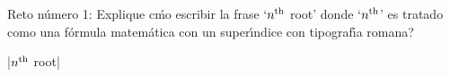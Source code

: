 

\bigskip

\enunciadoS Reto n\'umero 1: Explique c\'mo escribir la frase 
`$n^{\rm th}$ root' donde `$n^{\rm th}$' es tratado como una 
f\'ormula matem\'atica con un super\'{\i}ndice con 
tipograf\'{\i}a romana?

\bigskip

\respuestaS

|$n^{\rm th}$ root|

\bye

